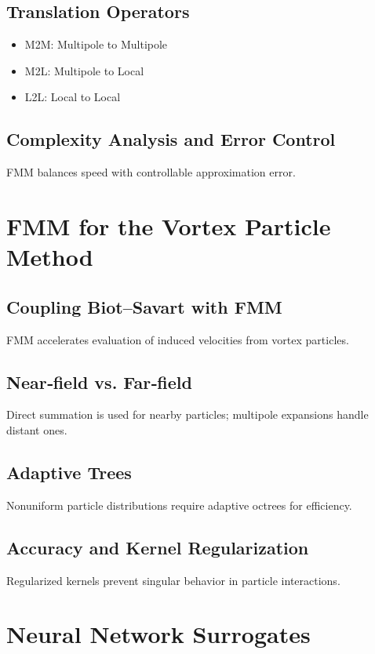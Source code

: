 \documentclass[conf]{new-aiaa} %
\begin{document}
\subsection{Translation Operators}
\begin{itemize}
  \item M2M: Multipole to Multipole
  \item M2L: Multipole to Local
  \item L2L: Local to Local
\end{itemize}

\subsection{Complexity Analysis and Error Control}
FMM balances speed with controllable approximation error.

\section{FMM for the Vortex Particle Method}

\subsection{Coupling Biot--Savart with FMM}
FMM accelerates evaluation of induced velocities from vortex particles.

\subsection{Near‐field vs. Far‐field}
Direct summation is used for nearby particles; multipole expansions handle distant ones.

\subsection{Adaptive Trees}
Nonuniform particle distributions require adaptive octrees for efficiency.

\subsection{Accuracy and Kernel Regularization}
Regularized kernels prevent singular behavior in particle interactions.

\section{Neural Network Surrogates}
\end{document}
